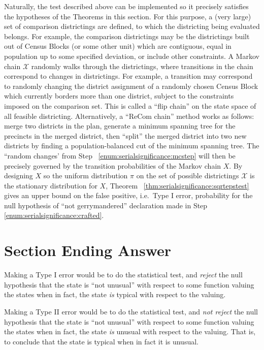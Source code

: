 \documentclass[12pt]{article}
\begin{document}
Naturally, the test described above can be implemented so it precisely
satisfies the hypotheses of the Theorems in this section.  For this
purpose, a (very large) set of comparison districtings are defined, to
which the districting being evaluated belongs.  For example, the
comparison districtings may be the districtings built out of Census
Blocks (or some other unit) which are contiguous, equal in population up
to some specified deviation, or include other constraints.  A Markov
chain \( \mathcal{X} \) randomly walks through the districtings, where
transitions in the chain correspond to changes in districtings.  For
example, a transition may correspond to randomly changing the district
assignment of a randomly chosen Census Block which currently borders
more than one district, subject to the constraints imposed on the
comparison set.  This is called a ``flip chain'' on the state space of
all feasible districting.  Alternatively, a ``ReCom chain'' method works
as follows:  merge two districts in the plan, generate a minimum
spanning tree for the precincts in the merged district, then ``split''
the merged district into two new districts by finding a
population-balanced cut of the minimum spanning tree.  The ``random
changes' from Step~%
\ref{enum:serialsignificance:mcstep} will then be precisely governed by
the transition probabilities of the Markov chain \( X \).  By designing \(
X \) so the uniform distribution \( \pi \) on the set of possible
districtings \( \mathcal{X} \) is the stationary distribution for \( X \),
Theorem~%
\ref{thm:serialsignificance:sqrtepstest} gives an upper bound on the
false positive, i.e.\ Type I error, probability for the null hypothesis
of ``not gerrymandered'' declaration made in Step~%
\ref{enum:serialsignificance:crafted}.

\section*{Section Ending Answer}

Making a Type I error would be to do the statistical test, and \emph{reject}
the null hypothesis that the state is ``not unusual'' with respect to
some function valuing the states when in fact, the state \emph{is}
typical with respect to the valuing.

Making a Type II error would be to do the statistical test, and \emph{not
reject} the null hypothesis that the state is ``not unusual'' with
respect to some function valuing the states when in fact, the state
\emph{is} unusual with respect to the valuing.  That is, to conclude
that the state is typical when in fact it is unusual.
\end{document}
